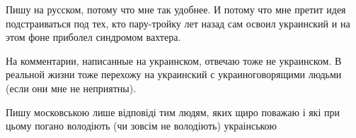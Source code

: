 \begin{itemize}

Пишу на русском, потому что мне так удобнее. И потому что мне претит идея
подстраиваться под тех, кто пару-тройку лет назад сам освоил украинский и на
этом фоне приболел синдромом вахтера.

На комментарии, написанные на украинском, отвечаю тоже не украинском. В
реальной жизни тоже перехожу на украинский с украиноговорящими людьми (если они
мне не неприятны).


Пишу московською лише відповіді тим людям, яких щиро поважаю і які при цьому
погано володіють (чи зовсім не володіють) украінською

\end{itemize} %
